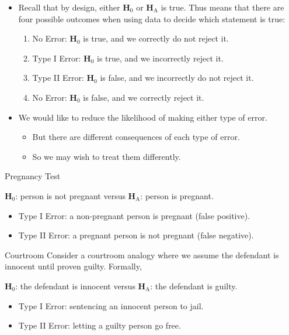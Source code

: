 \begin{itemize}
    \item Recall that by design, either $ \mathbf{H}_0 $ or $ \mathbf{H}_\text{A} $ is true.
          Thus means that there are four possible outcomes when using data to decide which
          statement is true:
          \begin{enumerate}[(1)]
              \item No Error: $ \mathbf{H}_0 $ is true, and we correctly do not reject it.
              \item Type I Error: $ \mathbf{H}_0 $ is true, and we incorrectly reject it.
              \item Type II Error: $ \mathbf{H}_0 $ is false, and we incorrectly do not reject it.
              \item No Error: $ \mathbf{H}_0 $ is false, and we correctly reject it.
          \end{enumerate}
    \item We would like to reduce the likelihood of making either type of error.
          \begin{itemize}
              \item But there are different consequences of each type of error.
              \item So we may wish to treat them differently.
          \end{itemize}
\end{itemize}
\begin{Example}{Pregnancy Test}{}
    \begin{tightcenter}
        $ \mathbf{H}_0 $: person is not pregnant versus $ \mathbf{H}_\text{A} $: person is pregnant.
    \end{tightcenter}
    \begin{itemize}
        \item Type I Error: a non-pregnant person is pregnant (false positive).
        \item Type II Error: a pregnant person is not pregnant (false negative).
    \end{itemize}
\end{Example}
\begin{Example}{Courtroom}{}
    Consider a courtroom analogy where we assume the defendant is innocent until proven guilty. Formally,
    \begin{tightcenter}
        $ \mathbf{H}_0 $: the defendant is innocent versus $ \mathbf{H}_\text{A} $: the defendant is guilty.
    \end{tightcenter}
    \begin{itemize}
        \item Type I Error: sentencing an innocent person to jail.
        \item Type II Error: letting a guilty person go free.
    \end{itemize}
\end{Example}
